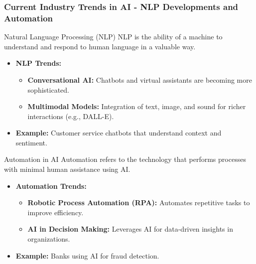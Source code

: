 \documentclass{beamer}
\begin{document}
\begin{frame}[fragile]
    \frametitle{Current Industry Trends in AI - NLP Developments and Automation}
    \begin{block}{Natural Language Processing (NLP)}
        NLP is the ability of a machine to understand and respond to human language in a valuable way.
    \end{block}
    \begin{itemize}
        \item \textbf{NLP Trends:}
        \begin{itemize}
            \item \textbf{Conversational AI:} Chatbots and virtual assistants are becoming more sophisticated.
            \item \textbf{Multimodal Models:} Integration of text, image, and sound for richer interactions (e.g., DALL-E).
        \end{itemize}
        \item \textbf{Example:} Customer service chatbots that understand context and sentiment.
    \end{itemize}
    
    \begin{block}{Automation in AI}
        Automation refers to the technology that performs processes with minimal human assistance using AI.
    \end{block}
    \begin{itemize}
        \item \textbf{Automation Trends:}
        \begin{itemize}
            \item \textbf{Robotic Process Automation (RPA):} Automates repetitive tasks to improve efficiency.
            \item \textbf{AI in Decision Making:} Leverages AI for data-driven insights in organizations.
        \end{itemize}
        \item \textbf{Example:} Banks using AI for fraud detection.
    \end{itemize}
\end{frame}
\end{document}
